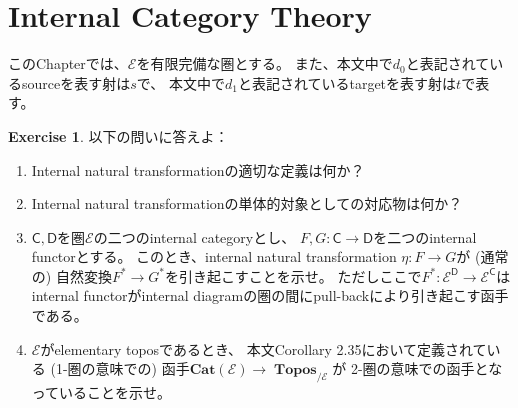 \documentclass[uplatex]{jsarticle}
\theoremstyle{definition}
\newtheorem{prob}[prob]{Exercise}
\def\mcE{\mathcal{E}}
\def\msC{\mathsf{C}}
\def\msD{\mathsf{D}}
\DeclareMathOperator{\Topos}{\mathbf{Topos}}
\begin{document}
\newpage
\renewcommand{\thesection}{Chapter \arabic{section}:}
\section{\protect\quad Internal Category Theory}
\label{section: 2}
\renewcommand{\thesection}{\arabic{section}}


このChapterでは、\(\mcE\)を有限完備な圏とする。
また、本文中で\(d_0\)と表記されているsourceを表す射は\(s\)で、
本文中で\(d_1\)と表記されているtargetを表す射は\(t\)で表す。


\begin{prob}\label{prob: 2.1}
  以下の問いに答えよ：
  \begin{enumerate}
    \item \label{enumi: prob: 2.1.1}
    Internal natural transformationの適切な定義は何か？
    \item \label{enumi: prob: 2.1.2}
    Internal natural transformationの単体的対象としての対応物は何か？
    \item \label{enumi: prob: 2.1.3}
    \(\msC,\msD\)を圏\(\mcE\)の二つのinternal categoryとし、
    \(F,G:\msC \to \msD\)を二つのinternal functorとする。
    このとき、internal natural transformation \(\eta:F\to G\)が
    (通常の) 自然変換\(F^*\to G^*\)を引き起こすことを示せ。
    ただしここで\(F^*:\mcE^{\msD} \to \mcE^{\msC}\)は
    internal functorがinternal diagramの圏の間にpull-backにより引き起こす函手である。
    \item \label{enumi: prob: 2.1.4}
    \(\mcE\)がelementary toposであるとき、
    本文Corollary 2.35において定義されている
    (1-圏の意味での) 函手\(\mathbf{Cat}(\mcE) \to \Topos_{/\mcE}\)が
    2-圏の意味での函手となっていることを示せ。
  \end{enumerate}
\end{prob}
\end{document}
